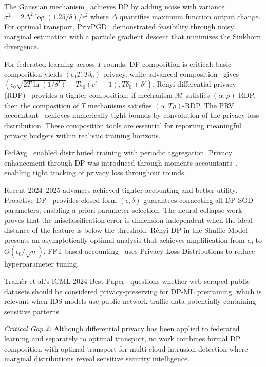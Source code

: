 \documentclass{ieeeaccess}
\newcommand{\M}{\mathcal{M}}
\theoremstyle{plain}
\theoremstyle{definition}
\theoremstyle{remark}
\begin{document}
The Gaussian mechanism~\cite{dwork2006,balle2018} achieves DP by adding noise with variance $\sigma^2 = 2\Delta^2 \log(1.25/\delta)/\epsilon^2$ where $\Delta$ quantifies maximum function output change. For optimal transport, PrivPGD~\cite{chen2022} demonstrated feasibility through noisy marginal estimation with a particle gradient descent that minimizes the Sinkhorn divergence.

For federated learning across $T$ rounds, DP composition is critical: basic composition yields $(\epsilon_0 T, T\delta_0)$ privacy, while advanced composition~\cite{kairouz2015} gives $(\epsilon_0\sqrt{2T\ln(1/\delta')} + T\epsilon_0(e^{\epsilon_0}-1), T\delta_0 + \delta')$. R\'{e}nyi differential privacy (RDP)~\cite{mironov2017} provides a tighter composition: if mechanism $\M$ satisfies $(\alpha, \rho)$-RDP, then the composition of $T$ mechanisms satisfies $(\alpha, T\rho)$-RDP. The PRV accountant~\cite{gopi2021} achieves numerically tight bounds by convolution of the privacy loss distribution. These composition tools are essential for reporting meaningful privacy budgets within realistic training horizons.

FedAvg~\cite{mcmahan2017} enabled distributed training with periodic aggregation. Privacy enhancement through DP was introduced through moments accountants~\cite{abadi2016}, enabling tight tracking of privacy loss throughout rounds.

Recent 2024--2025 advances achieved tighter accounting and better utility. Proactive DP~\cite{vandijk2024} provides closed-form $(\epsilon, \delta)$-guarantees connecting all DP-SGD parameters, enabling a-priori parameter selection. The neural collapse work~\cite{wang2024nc} proves that the misclassification error is dimension-independent when the ideal distance of the feature is below the threshold. R\'{e}nyi DP in the Shuffle Model~\cite{chen2024rdp} presents an asymptotically optimal analysis that achieves amplification from $\epsilon_0$ to $O(\epsilon_0/\sqrt{n})$. FFT-based accounting~\cite{guo2024} uses Privacy Loss Distributions to reduce hyperparameter tuning.

Tram\`{e}r et al.'s ICML 2024 Best Paper~\cite{tramer2024} questions whether web-scraped public datasets should be considered privacy-preserving for DP-ML pretraining, which is relevant when IDS models use public network traffic data potentially containing sensitive patterns.

\textit{Critical Gap 2:} Although differential privacy has been applied to federated learning and separately to optimal transport, no work combines formal DP composition with optimal transport for multi-cloud intrusion detection where marginal distributions reveal sensitive security intelligence.
\end{document}
